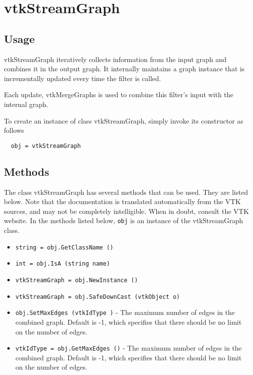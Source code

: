 \section{vtkStreamGraph}

\subsection{Usage}

 vtkStreamGraph iteratively collects information from the input graph
 and combines it in the output graph. It internally maintains a graph
 instance that is incrementally updated every time the filter is called.

 Each update, vtkMergeGraphs is used to combine this filter's input with the
 internal graph.

To create an instance of class vtkStreamGraph, simply
invoke its constructor as follows
\begin{verbatim}
  obj = vtkStreamGraph
\end{verbatim}
\subsection{Methods}

The class vtkStreamGraph has several methods that can be used.
  They are listed below.
Note that the documentation is translated automatically from the VTK sources,
and may not be completely intelligible.  When in doubt, consult the VTK website.
In the methods listed below, \verb|obj| is an instance of the vtkStreamGraph class.
\begin{itemize}
\item  \verb|string = obj.GetClassName ()|

\item  \verb|int = obj.IsA (string name)|

\item  \verb|vtkStreamGraph = obj.NewInstance ()|

\item  \verb|vtkStreamGraph = obj.SafeDownCast (vtkObject o)|

\item  \verb|obj.SetMaxEdges (vtkIdType )| -  The maximum number of edges in the combined graph. Default is -1,
 which specifies that there should be no limit on the number
 of edges.

\item  \verb|vtkIdType = obj.GetMaxEdges ()| -  The maximum number of edges in the combined graph. Default is -1,
 which specifies that there should be no limit on the number
 of edges.

\end{itemize}

